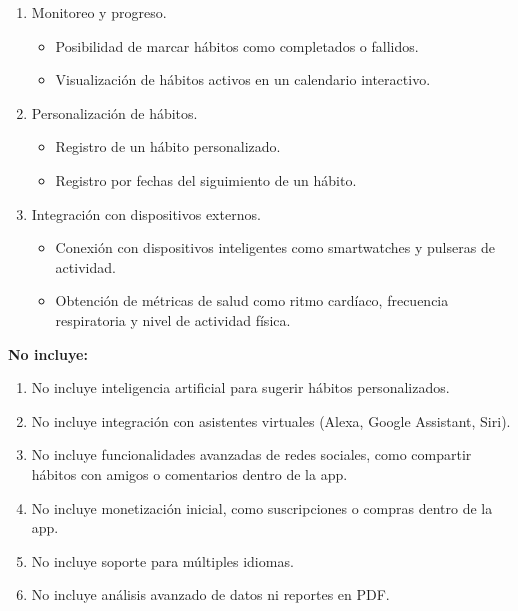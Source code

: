 \documentclass[letterpaper,12pt,oneside]{article}
\begin{document}
\begin{enumerate}
\begin{itemize}
                \end{itemize}
            \item Monitoreo y progreso.
                \begin{itemize}
                    \item Posibilidad de marcar hábitos como completados o fallidos.
                    \item Visualización de hábitos activos en un calendario interactivo.
                \end{itemize}
            \item Personalización de hábitos.
                \begin{itemize}
                    \item Registro de un hábito personalizado.
                    \item Registro por fechas del siguimiento de un hábito.
                \end{itemize}
            \item Integración con dispositivos externos.
                \begin{itemize}
                    \item Conexión con dispositivos inteligentes como smartwatches y pulseras de actividad.
                    \item Obtención de métricas de salud como ritmo cardíaco, frecuencia respiratoria y nivel de actividad física.
                \end{itemize}
        \end{enumerate}

        \textbf{No incluye:}
        \begin{enumerate}
            \item No incluye inteligencia artificial para sugerir hábitos personalizados.
            \item No incluye integración con asistentes virtuales (Alexa, Google Assistant, Siri).
            \item No incluye funcionalidades avanzadas de redes sociales, como compartir hábitos con amigos o comentarios dentro de la app.
            \item No incluye monetización inicial, como suscripciones o compras dentro de la app.
            \item No incluye soporte para múltiples idiomas.
            \item No incluye análisis avanzado de datos ni reportes en PDF.
        \end{enumerate}
\end{document}
